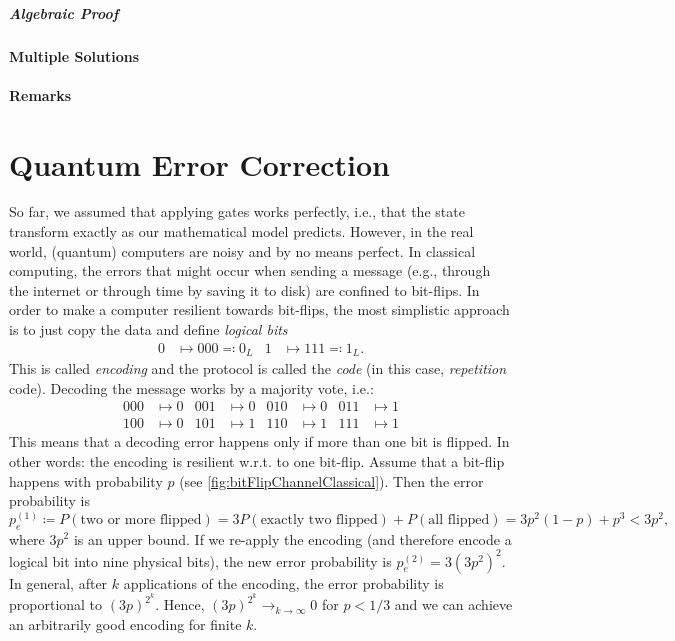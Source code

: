 				\paragraph{Algebraic Proof} %

			\subsubsection{Multiple Solutions} %

			\subsubsection{Remarks} %

\chapter{Quantum Error Correction}
	So far, we assumed that applying gates works perfectly, i.e., that the state transform exactly as our mathematical model predicts. However, in the real world, (quantum) computers are noisy and by no means perfect. In classical computing, the errors that might occur when sending a message (e.g., through the internet or through time by saving it to disk) are confined to bit-flips. In order to make a computer resilient towards bit-flips, the most simplistic approach is to just copy the data and define \emph{logical bits}
	\begin{align}
		0 &\mapsto 000 \eqqcolon 0_L &
		1 &\mapsto 111 \eqqcolon 1_L.
	\end{align}
	This is called \emph{encoding} and the protocol is called the \emph{code} (in this case, \emph{repetition} code). Decoding the message works by a majority vote, i.e.:
	\begin{align}
		000 &\mapsto 0 &
		001 &\mapsto 0 &
		010 &\mapsto 0 &
		011 &\mapsto 1 \\
		100 &\mapsto 0 &
		101 &\mapsto 1 &
		110 &\mapsto 1 &
		111 &\mapsto 1
	\end{align}
	This means that a decoding error happens only if more than one bit is flipped. In other words: the encoding is resilient w.r.t. to one bit-flip. Assume that a bit-flip happens with probability \(p\) (see \autoref{fig:bitFlipChannelClassical}). Then the error probability is
	\begin{equation}
		p_e^{(1)} \coloneqq P(\text{two or more flipped})
			= 3 P(\text{exactly two flipped}) + P(\text{all flipped})
			= 3 p^2 (1 - p) + p^3
			< 3p^2,
	\end{equation}
	where \( 3p^2 \) is an upper bound. If we re-apply the encoding (and therefore encode a logical bit into nine physical bits), the new error probability is \( p_e^{(2)} = 3 (3p^2)^2 \). In general, after \(k\) applications of the encoding, the error probability is proportional to \( (3p)^{2^k} \). Hence, \( (3p)^{2^k} \to_{k \to \infty} 0 \) for \(p < 1/3\) and we can achieve an arbitrarily good encoding for finite \(k\).

